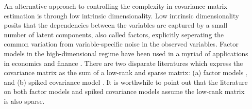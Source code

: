 \documentclass[11pt,oneside]{amsart}
\begin{document}
%

An alternative approach to controlling the complexity in covariance matrix estimation is through low intrinsic dimensionality. Low intrinsic dimensionality posits that the dependencies between the variables are captured by a small number of latent components, also called factors, explicitly seperating the common variation from variable-specific noise in the observed variables. Factor models in the high-dimensional regime have been used in a myriad of applications in economics and finance \citep{engle1981one, goldfarb2003robust}. There are two disparate literatures which express the covariance matrix as the sum of a low-rank and sparse matrix: (a) factor models \citep{bhattacharya2011sparse, fan2013large, pati2014posterior}, and (b) spiked covariance model \citep{johnstone2001distribution}. It is worthwhile to point out that the literature on both factor models and spiked covariance models assume the low-rank matrix is also sparse. 
\end{document}
